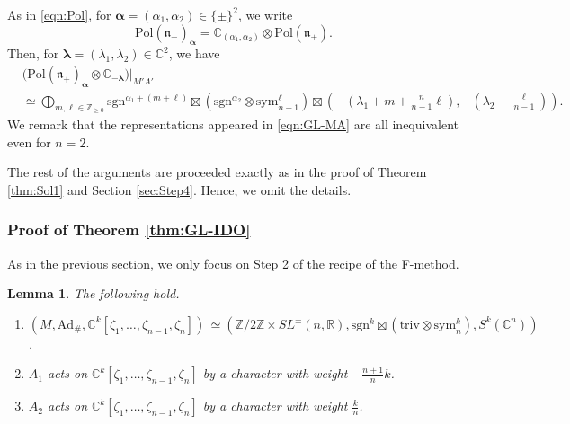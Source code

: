\documentclass[reqno,11pt]{amsart}
\newtheorem{lem}[equation]{Lemma}
\theoremstyle{remark}
\theoremstyle{definition}
\numberwithin{equation}{section}
\newcommand{\ga}{\alpha}
\newcommand{\fn}{{\mathfrak n}}
\newcommand{\R}{\mathbb{R}}
\newcommand{\C}{\mathbb{C}}
\newcommand{\Z}{\mathbb{Z}}
\newcommand{\Ad}{\mathrm{Ad}}
\newcommand{\Pol}{\mathrm{Pol}}
\newcommand{\triv}{\mathrm{triv}}
\newcommand{\sym}{\mathrm{sym}}
\newcommand{\sgn}{\mathrm{sgn}}
\newcommand{\balpha}{\bm{\alpha}}
\newcommand{\blambda}{\bm{\lambda}}
\begin{document}
As in \eqref{eqn:Pol}, for $\balpha=(\alpha_1,\alpha_2) \in \{\pm\}^2$, we write
\begin{equation*}
\Pol(\fn_+)_{\balpha} =\C_{(\ga_1,\ga_2)} \otimes \Pol(\fn_+).
\end{equation*}
Then, for $\blambda=(\lambda_1,\lambda_2) \in \C^2$,  we have
\begin{align}\label{eqn:GL-MA}
&\big(\Pol(\fn_+)_{\balpha}
\otimes \C_{-\blambda}\big)\vert_{M'A'} \nonumber\\
&\simeq 
\bigoplus_{m, \ell \in \Z_{\geq 0}} 
\sgn^{\ga_1+(m+\ell)}\boxtimes
(\sgn^{\ga_2} \otimes\sym^\ell_{n-1}) \boxtimes 
(-(\lambda_1+m+\tfrac{n}{n-1}\ell), -(\lambda_2-\tfrac{\ell}{n-1})).
\end{align}
We remark that the representations appeared in 
\eqref{eqn:GL-MA} are all inequivalent even for $n=2$.

The rest of the arguments are proceeded exactly as in the proof of 
Theorem \ref{thm:Sol1} and Section \ref{sec:Step4}. Hence, we omit the details.

\subsubsection{
Proof of Theorem \ref{thm:GL-IDO}
}
\label{sec:GL-proof2}

As in the previous section, we only focus on Step 2 of the recipe of the F-method.


\begin{lem}\label{lem:GL-MA2}
The following hold.

\begin{enumerate}

\item[\emph{(1)}]
$(M, \Ad_\#, \C^k[\zeta_1,\ldots, \zeta_{n-1},\zeta_n]) 
\hspace{2pt}
\simeq (\Z/2\Z\times SL^\pm(n,\R), \sgn^k \boxtimes 
(\triv \otimes \sym^k_{n}), S^k(\C^{n}))$.

\item[\emph{(2)}]
$A_1$ acts on $\C^k[\zeta_1,\ldots, \zeta_{n-1},\zeta_n]$ by a character 
with weight $-\frac{n+1}{n}k$.

\item[\emph{(3)}]
$A_2$ acts on $\C^k[\zeta_1,\ldots, \zeta_{n-1},\zeta_n]$ 
by a character with weight
$\tfrac{k}{n}$.


\end{enumerate}

\end{lem}
\end{document}
